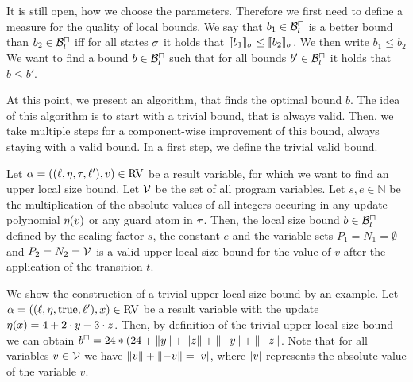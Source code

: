 It is still open, how we choose the parameters.
Therefore we first need to define a measure for the quality of local bounds.
We say that $b_1 \in \mathcal{B}^\sqcap_l$ is a better bound than $b_2 \in \mathcal{B}^\sqcap_l$ iff for all states $\sigma$ it holds that $\llbracket b_1 \rrbracket_{\sigma} \leq \llbracket b_2 \rrbracket_{\sigma}$.
We then write $b_1 \leq b_2$
We want to find a bound $b \in \mathcal{B}^\sqcap_l$ such that for all bounds $b' \in \mathcal{B}^\sqcap_l$ it holds that $b \leq b'$.

At this point, we present an algorithm, that finds the optimal bound $b$.
The idea of this algorithm is to start with a trivial bound, that is always valid.
Then, we take multiple steps for a component-wise improvement of this bound, always staying with a valid bound.
In a first step, we define the trivial valid bound.

\begin{definition}
  Let $\alpha = ((\ell,\eta,\tau,\ell'),v) \in \text{RV}$ be a result variable, for which we want to find an upper local size bound.
  Let $\mathcal{V}$ be the set of all program variables.
  Let $s, e \in \mathbb{N}$ be the multiplication of the absolute values of all integers occuring in any update polynomial $\eta(v)$ or any guard atom in $\tau$.
  Then, the local size bound $b \in \mathcal{B}^\sqcap_l$ defined by the scaling factor $s$, the constant $e$ and the variable sets $P_1 = N_1 = \emptyset$ and $P_2 = N_2 = \mathcal{V}$ is a valid upper local size bound for the value of $v$ after the application of the transition $t$.
\end{definition}


We show the construction of a trivial upper local size bound by an example.
Let $\alpha = ((\ell,\eta,\text{true},\ell'),x) \in \text{RV}$ be a result variable with the update $\eta(x) = 4 + 2 \cdot y - 3 \cdot z$.
Then, by definition of the trivial upper local size bound we can obtain $b^\sqcap = 24 * (24 + \left\Vert y\right\Vert + \left\Vert z\right\Vert + \left\Vert-y\right\Vert + \left\Vert-z\right\Vert$.
Note that for all variables $v \in \mathcal{V}$ we have $\left\Vert v\right\Vert + \left\Vert-v\right\Vert = \left|v\right|$, where $\left|v\right|$ represents the absolute value of the variable $v$.

